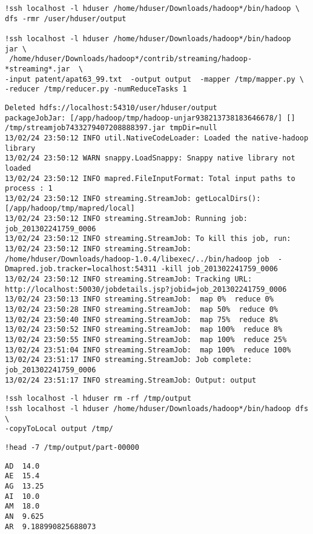 \documentclass[12pt,fleqn]{article}\usepackage{../common}
\begin{document}
\begin{verbatim}
!ssh localhost -l hduser /home/hduser/Downloads/hadoop*/bin/hadoop \
dfs -rmr /user/hduser/output

!ssh localhost -l hduser /home/hduser/Downloads/hadoop*/bin/hadoop  jar \
 /home/hduser/Downloads/hadoop*/contrib/streaming/hadoop-*streaming*.jar  \
-input patent/apat63_99.txt  -output output  -mapper /tmp/mapper.py \
-reducer /tmp/reducer.py -numReduceTasks 1 
\end{verbatim}

\begin{verbatim}
Deleted hdfs://localhost:54310/user/hduser/output
packageJobJar: [/app/hadoop/tmp/hadoop-unjar938213738183646678/] [] /tmp/streamjob7433279407208888397.jar tmpDir=null
13/02/24 23:50:12 INFO util.NativeCodeLoader: Loaded the native-hadoop library
13/02/24 23:50:12 WARN snappy.LoadSnappy: Snappy native library not loaded
13/02/24 23:50:12 INFO mapred.FileInputFormat: Total input paths to process : 1
13/02/24 23:50:12 INFO streaming.StreamJob: getLocalDirs(): [/app/hadoop/tmp/mapred/local]
13/02/24 23:50:12 INFO streaming.StreamJob: Running job: job_201302241759_0006
13/02/24 23:50:12 INFO streaming.StreamJob: To kill this job, run:
13/02/24 23:50:12 INFO streaming.StreamJob: /home/hduser/Downloads/hadoop-1.0.4/libexec/../bin/hadoop job  -Dmapred.job.tracker=localhost:54311 -kill job_201302241759_0006
13/02/24 23:50:12 INFO streaming.StreamJob: Tracking URL: http://localhost:50030/jobdetails.jsp?jobid=job_201302241759_0006
13/02/24 23:50:13 INFO streaming.StreamJob:  map 0%  reduce 0%
13/02/24 23:50:28 INFO streaming.StreamJob:  map 50%  reduce 0%
13/02/24 23:50:40 INFO streaming.StreamJob:  map 75%  reduce 8%
13/02/24 23:50:52 INFO streaming.StreamJob:  map 100%  reduce 8%
13/02/24 23:50:55 INFO streaming.StreamJob:  map 100%  reduce 25%
13/02/24 23:51:04 INFO streaming.StreamJob:  map 100%  reduce 100%
13/02/24 23:51:17 INFO streaming.StreamJob: Job complete: job_201302241759_0006
13/02/24 23:51:17 INFO streaming.StreamJob: Output: output
\end{verbatim}

\begin{verbatim}
!ssh localhost -l hduser rm -rf /tmp/output
!ssh localhost -l hduser /home/hduser/Downloads/hadoop*/bin/hadoop dfs  \
-copyToLocal output /tmp/
\end{verbatim}

\begin{verbatim}
!head -7 /tmp/output/part-00000
\end{verbatim}

\begin{verbatim}
AD	14.0
AE	15.4
AG	13.25
AI	10.0
AM	18.0
AN	9.625
AR	9.188990825688073
\end{verbatim}
\end{document}
